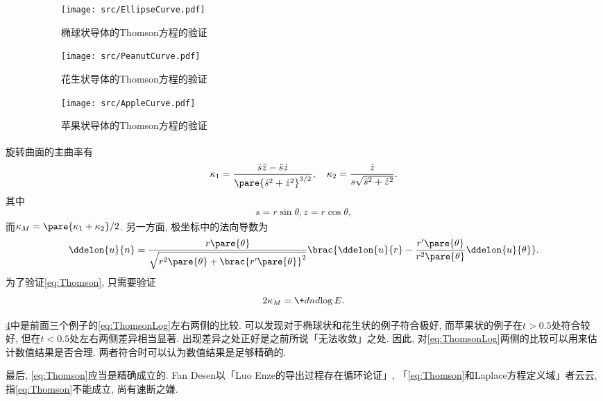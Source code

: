 \documentclass[hidelinks]{ctexart}
\let\oldcite\cite
\def\cite#1{\textsuperscript{\oldcite{#1}}}
\begin{document}
\begin{figure}
    \centering
    \begin{subfigure}{.7\textwidth}
        \centering
        \texttt{[image: src/EllipseCurve.pdf]}
        \caption{椭球状导体的Thomson方程的验证}
        \label{fig:椭球状导体的Thomson方程的验证}
    \end{subfigure}
    \begin{subfigure}{.7\textwidth}
        \centering
        \texttt{[image: src/PeanutCurve.pdf]}
        \caption{花生状导体的Thomson方程的验证}
        \label{fig:花生状导体的Thomson方程的验证}
    \end{subfigure}
    \begin{subfigure}{.7\textwidth}
        \centering
        \texttt{[image: src/AppleCurve.pdf]}
        \caption{苹果状导体的Thomson方程的验证}
        \label{fig:苹果状导体的Thomson方程的验证}
    \end{subfigure}
    \caption{}
    \label{fig:导体的Thomson方程的验证}
\end{figure}

\par
旋转曲面的主曲率有\cite{Kuhnel}
\[ \kappa_1 = \frac{\dot{s}\ddot{z}-\ddot{s}\dot{z}}{\pare{\dot{s}^2+\dot{z}^2}^{3/2}},\quad%
 \kappa_2 = \frac{\dot{z}}{s\sqrt{\dot{s}^2+\dot{z}^2}}. \]
其中
\[ s = r\sin\theta, z = r\cos\theta, \]
而$\kappa_M = \pare{\kappa_1+\kappa_2}/2$. 另一方面, 极坐标中的法向导数为\cite{LiuCS}
\[ \ddelon{u}{n} = \frac{r\pare{\theta}}{\sqrt{r^2\pare{\theta}+\brac{r'\pare{\theta}}^2}}\brac{\ddelon{u}{r} - \frac{r'\pare{\theta}}{r^2\pare{\theta}}\ddelon{u}{\theta}}. \]
为了验证\eqref{eq:Thomson}, 只需要验证
\begin{equation}
\label{eq:ThomsonLog}
2\kappa_M = \+dnd{\log E}.
\end{equation}

\cref{fig:导体的Thomson方程的验证}中是前面三个例子的\eqref{eq:ThomsonLog}左右两侧的比较. 可以发现对于椭球状和花生状的例子符合极好, 而苹果状的例子在$t>0.5$处符合较好, 但在$t<0.5$处左右两侧差异相当显著. 出现差异之处正好是之前所说「无法收敛」之处. 因此, 对\eqref{eq:ThomsonLog}两侧的比较可以用来估计数值结果是否合理. 两者符合时可以认为数值结果是足够精确的.
\par
最后, \eqref{eq:Thomson}应当是精确成立的. Fan Desen以「Luo Enze的导出过程存在循环论证」, 「\eqref{eq:Thomson}和Laplace方程定义域」者云云, 指\eqref{eq:Thomson}不能成立, 尚有速断之嫌.





\end{document}

